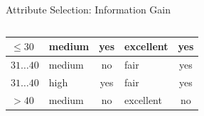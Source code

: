 \documentclass[aspectratio=169,t,table]{beamer}
\begin{document}
{\begin{frame}{Attribute Selection: Information Gain}
\begin{columns}
\begin{column}{0.45\textwidth}
{\begin{tabular}{|l|l|c|l|c|}
            \cellcolor{yellow!20}$\leq30$ & \cellcolor{yellow!20}medium & \cellcolor{yellow!20}yes & \cellcolor{yellow!20}excellent & \cellcolor{green!20}yes \\\hline
            \cellcolor{yellow!20}$31\ldots40$ & \cellcolor{yellow!20}medium & \cellcolor{yellow!20}no & \cellcolor{yellow!20}fair & \cellcolor{green!20}yes \\\hline
            \cellcolor{yellow!20}$31\ldots40$ & \cellcolor{yellow!20}high & \cellcolor{yellow!20}yes & \cellcolor{yellow!20}fair & \cellcolor{green!20}yes \\\hline
            \cellcolor{yellow!20}$>40$ & \cellcolor{yellow!20}medium & \cellcolor{yellow!20}no & \cellcolor{yellow!20}excellent & \cellcolor{red!20}no \\\hline
          \end{tabular}}
        \end{column}
      \end{columns}
    \end{frame}
  }
\end{document}

